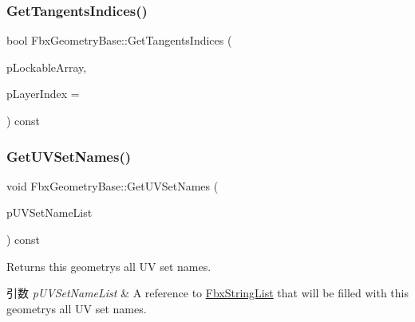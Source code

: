 \mbox{\label{class_fbx_geometry_base_aa1da929bb1905386e98d8e1caff3556e}} 
\subsubsection{\texorpdfstring{Get\+Tangents\+Indices()}{GetTangentsIndices()}}
{\footnotesize\ttfamily bool Fbx\+Geometry\+Base\+::\+Get\+Tangents\+Indices (\begin{DoxyParamCaption}\item[{\hyperlink{class_fbx_layer_element_array_template}{Fbx\+Layer\+Element\+Array\+Template}$<$ int $>$ $\ast$$\ast$}]{p\+Lockable\+Array,  }\item[{const int}]{p\+Layer\+Index = {} }\end{DoxyParamCaption}) const}

\mbox{\label{class_fbx_geometry_base_a65147440e2f577ab7f5b60e228881641}} 
\subsubsection{\texorpdfstring{Get\+U\+V\+Set\+Names()}{GetUVSetNames()}}
{\footnotesize\ttfamily void Fbx\+Geometry\+Base\+::\+Get\+U\+V\+Set\+Names (\begin{DoxyParamCaption}\item[{\hyperlink{class_fbx_string_list}{Fbx\+String\+List} \&}]{p\+U\+V\+Set\+Name\+List }\end{DoxyParamCaption}) const}

Returns this geometry\textquotesingle{}s all UV set names. 
\begin{DoxyParams}{引数}
{\em p\+U\+V\+Set\+Name\+List} & A reference to {\ttfamily \hyperlink{class_fbx_string_list}{Fbx\+String\+List}} that will be filled with this geometry\textquotesingle{}s all UV set names. \\
\hline
\end{DoxyParams}
\mbox{\label{class_fbx_geometry_base_abc912331f01b903dee155a1a3dbff0b8}} 
